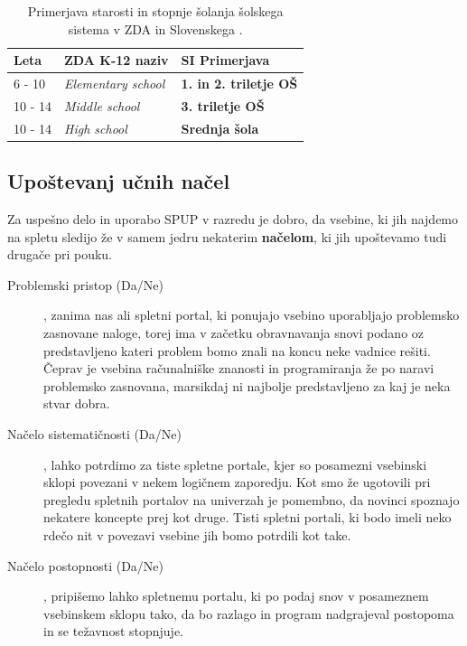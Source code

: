 \begin{table}[!h]
\caption{Primerjava starosti in stopnje šolanja šolskega sistema v ZDA
  in Slovenskega \cite{wiki:k12}.}
\label{tab:primerjava_šolski}
\begin{tabular}{
  | p{} |
  p{} |
  p{} |  }
\hline
  \rowcolor{sbase01!100}
  \textbf{Leta} & \textbf{ZDA K-12 naziv} & \textbf{SI Primerjava} \\
        \hline
      6 - 10    & \emph{Elementary school} & \textbf{1. in 2. triletje
                                             OŠ}\\
        \hline
      10 - 14    & \emph{Middle school} & \textbf{3. triletje OŠ} \\
        \hline
  10 - 14    & \emph{High school} & \textbf{Srednja šola} \\
  \hline
\end{tabular}
\end{table}

\subsection{Upoštevanj učnih načel}
\label{sec:upoštevanje_načel}

Za uspešno delo in uporabo SPUP v razredu je dobro, da vsebine, ki jih
najdemo na spletu sledijo že v samem jedru nekaterim \textbf{načelom}, ki jih
upoštevamo tudi drugače pri pouku.

\begin{description}
\item[Problemski pristop (Da/Ne)], zanima nas ali spletni portal, ki
  ponujajo vsebino uporabljajo problemsko zasnovane naloge, torej ima
  v začetku obravnavanja snovi podano oz predstavljeno kateri problem
  bomo znali na koncu neke vadnice rešiti. Čeprav je vsebina
  računalniške znanosti in programiranja že po naravi problemsko
  zasnovana, marsikdaj ni najbolje predstavljeno za kaj je neka stvar
  dobra.
\item[Načelo sistematičnosti (Da/Ne)], lahko potrdimo za tiste
  spletne portale, kjer so posamezni vsebinski sklopi povezani v nekem
  logičnem zaporedju. Kot smo že ugotovili pri pregledu spletnih
  portalov na univerzah je pomembno, da novinci spoznajo nekatere
  koncepte prej kot druge. Tisti spletni portali, ki bodo imeli neko
  rdečo nit v povezavi vsebine jih bomo potrdili kot take.
\item[Načelo postopnosti (Da/Ne)], pripišemo lahko spletnemu portalu,
  ki po podaj snov v posameznem vsebinskem sklopu tako, da bo razlago
  in program nadgrajeval postopoma in se težavnost stopnjuje.
\end{description}

